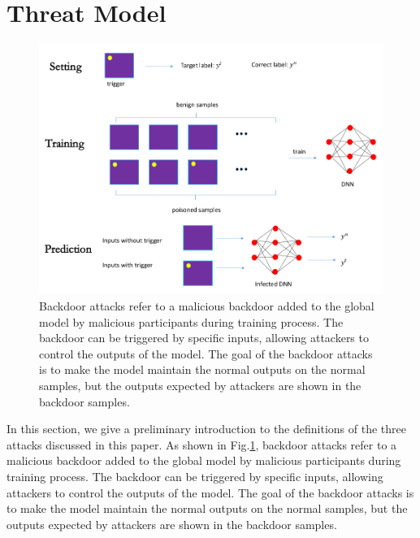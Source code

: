\documentclass[conference]{IEEEtran}
\begin{document}
\section{Threat Model}
\begin{figure}[htbp]
    \centerline{\includegraphics[width=0.8\linewidth,height=0.6\linewidth]{picture/backdoor_attack.png}}
    \caption{Backdoor attacks refer to a malicious backdoor 
    added to the global model by malicious participants during training process. 
    The backdoor can be triggered by specific inputs, 
    allowing attackers to control the outputs of the model. 
    The goal of the backdoor attacks is to make the model maintain the normal 
    outputs on the normal samples, but the outputs expected by attackers are 
    shown in the backdoor samples.}
    \label{fig2}
\end{figure}

In this section, we give a preliminary introduction to the definitions of the three attacks discussed in this paper.
As shown in Fig.\ref{fig2}, backdoor attacks\cite{b16,b17,b18,b19,b20} refer to a malicious backdoor 
added to the global model by malicious participants during training process. 
The backdoor can be triggered by specific inputs, 
allowing attackers to control the outputs of the model. 
The goal of the backdoor attacks is to make the model maintain the normal 
outputs on the normal samples, but the outputs expected by attackers are 
shown in the backdoor samples.
\end{document}
